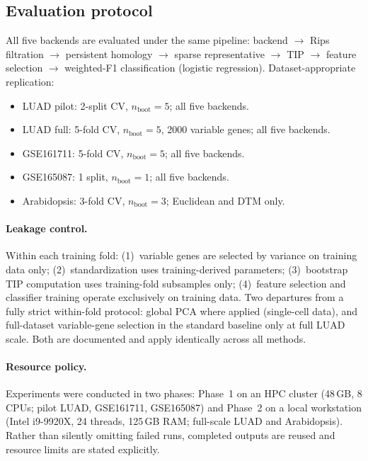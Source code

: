 \documentclass[12pt]{article}
\begin{document}
\subsection{Evaluation protocol}
\label{sec:evaluation}

All five backends are evaluated under the same pipeline: backend $\to$ Rips filtration $\to$ persistent homology $\to$ sparse representative $\to$ TIP $\to$ feature selection $\to$ weighted-F1 classification (logistic regression).
Dataset-appropriate replication:
\begin{itemize}[leftmargin=1.5em]
\item LUAD pilot: 2-split CV, $n_{\text{boot}} = 5$; all five backends.
\item LUAD full: 5-fold CV, $n_{\text{boot}} = 5$, 2000 variable genes; all five backends.
\item GSE161711: 5-fold CV, $n_{\text{boot}} = 5$; all five backends.
\item GSE165087: 1 split, $n_{\text{boot}} = 1$; all five backends.
\item Arabidopsis: 3-fold CV, $n_{\text{boot}} = 3$; Euclidean and DTM only.
\end{itemize}

\paragraph{Leakage control.}
Within each training fold: (1)~variable genes are selected by variance on training data only; (2)~standardization uses training-derived parameters; (3)~bootstrap TIP computation uses training-fold subsamples only; (4)~feature selection and classifier training operate exclusively on training data.
Two departures from a fully strict within-fold protocol: global PCA where applied (single-cell data), and full-dataset variable-gene selection in the standard baseline only at full LUAD scale.
Both are documented and apply identically across all methods.

\paragraph{Resource policy.}
Experiments were conducted in two phases: Phase~1 on an HPC cluster (48\,GB, 8 CPUs; pilot LUAD, GSE161711, GSE165087) and Phase~2 on a local workstation (Intel i9-9920X, 24 threads, 125\,GB RAM; full-scale LUAD and Arabidopsis).
Rather than silently omitting failed runs, completed outputs are reused and resource limits are stated explicitly.
\end{document}
